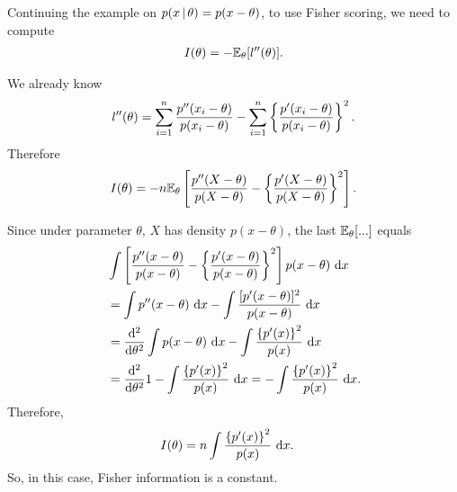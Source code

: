   \begin{frame}
    Continuing the example on $p(x\,|\,\theta)=p(x-\theta)$,
    to use Fisher scoring, we need to compute
    \begin{align*}
      I(\theta) = -\mathbb{E}_\theta[l''(\theta)].
    \end{align*}

    We already know
    \begin{align*}
      l''(\theta) = \sum_{i=1}^n
      \frac{p''(x_i-\theta)}{p(x_i-\theta)} -
      \sum_{i=1}^n \left\{\frac{p'(x_i-\theta)}{p(x_i-\theta)}\right\}^2.
    \end{align*}
    Therefore
    \begin{align*}
      I(\theta)
      = - n \mathbb{E}_\theta\left[
        \frac{
          p''(X-\theta)
        }{p(X-\theta)}
        - \left\{
          \frac{p'(X-\theta)}{p(X-\theta)}\right\}^2
      \right].
    \end{align*}

    \end{frame}



    \begin{frame}
    Since under parameter $\theta$, $X$ has density $p(x-\theta)$,
    the last $\mathbb{E}_\theta[...]$ equals
    \begin{align*}
      &
      \int \left[
        \frac{
          p''(x-\theta)
        }{p(x-\theta)}
        - \left\{
          \frac{p'(x-\theta)}{p(x-\theta)}\right\}^2
      \right] p(x-\theta)\,\, \mathrm{d} x \\
      &=
      \int p''(x-\theta)\,\, \mathrm{d} x - \int
      \frac{[p'(x-\theta)]^2}{p(x-\theta)}\,\, \mathrm{d} x \\
      &=
      \frac{\mathrm{d}^2}{\mathrm{d}\theta^2} \int p(x-\theta)\,\, \mathrm{d} x -
      \int \frac{\left\{p'(x)\right\}^2}{p(x)}\,\, \mathrm{d} x \\
      &=
      \frac{\mathrm{d}^2}{\mathrm{d}\theta^2} 1 -
      \int \frac{\left\{p'(x)\right\}^2}{p(x)}\,\, \mathrm{d} x
      =
      -\int \frac{\left\{p'(x)\right\}^2}{p(x)}\,\, \mathrm{d} x.
    \end{align*}
    Therefore,
    \begin{align*}
      I(\theta)
      &
      = n \int \frac{\left\{p'(x)\right\}^2}{p(x)}\,\, \mathrm{d} x.
    \end{align*}
    So, in this case, Fisher information is a constant.

  \end{frame}

